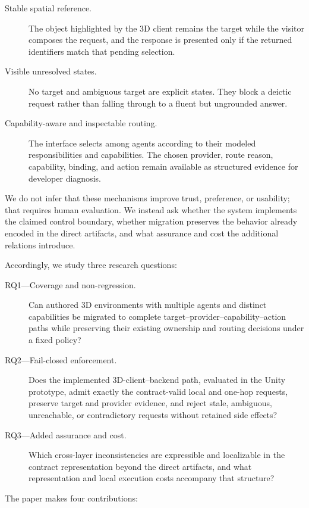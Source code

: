 \begin{description}
  \item[Stable spatial reference.] The object highlighted by the 3D client
  remains the target while the visitor composes the request, and the response is
  presented only if the returned identifiers match that pending selection.
  \item[Visible unresolved states.] No target and ambiguous target are explicit
  states.  They block a deictic request rather than falling through to a fluent
  but ungrounded answer.
  \item[Capability-aware and inspectable routing.] The interface selects among
  agents according to their modeled responsibilities and capabilities.  The
  chosen provider, route reason, capability, binding, and action remain
  available as structured evidence for developer diagnosis.
\end{description}

We do not infer that these mechanisms improve trust, preference, or usability;
that requires human evaluation.  We instead ask whether the system implements
the claimed control boundary, whether migration preserves the behavior already
encoded in the direct artifacts, and what assurance and cost the additional
relations introduce.

Accordingly, we study three research questions:

\begin{description}
  \item[RQ1---Coverage and non-regression.] Can authored 3D environments with
  multiple agents and distinct capabilities be migrated to complete
  target--provider--capability--action paths while preserving their existing
  ownership and routing decisions under a fixed policy?
  \item[RQ2---Fail-closed enforcement.] Does the implemented
  3D-client--backend path, evaluated in the Unity prototype, admit exactly the
  contract-valid local and one-hop requests, preserve target and provider
  evidence, and reject stale, ambiguous, unreachable, or contradictory requests
  without retained side effects?
  \item[RQ3---Added assurance and cost.] Which cross-layer inconsistencies are
  expressible and localizable in the contract representation beyond the direct
  artifacts, and what representation and local execution costs accompany that
  structure?
\end{description}

The paper makes four contributions:

